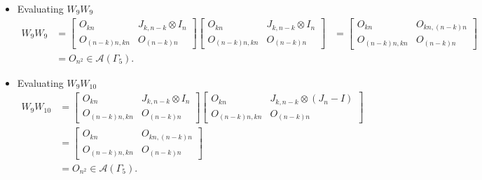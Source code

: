 \begin{itemize}
\item Evaluating $W_{9}W_{9}$
\begin{align*}
    W_9W_9
    &= \begin{bmatrix}
        O_{kn} & J_{k,n-k} \otimes I_n \\
        O_{(n-k)n,kn} & O_{(n-k)n}
    \end{bmatrix}
    \begin{bmatrix}
        O_{kn} & J_{k,n-k} \otimes I_n \\
        O_{(n-k)n,kn} & O_{(n-k)n}
    \end{bmatrix}
    &= \begin{bmatrix}
        O_{kn} & O_{kn, (n-k)n} \\
        O_{(n-k)n,kn} & O_{(n - k)n}
    \end{bmatrix}\\
    &= O_{n^2} \in\mathcal{A}(\Gamma_5).
\end{align*}

\item Evaluating $W_{9}W_{10}$
\begin{align*}
    W_9W_{10}
    &= \begin{bmatrix}
        O_{kn} & J_{k,n-k} \otimes I_n \\
        O_{(n-k)n,kn} & O_{(n-k)n}
    \end{bmatrix}
    \begin{bmatrix}
        O_{kn} & J_{k,n-k} \otimes (J_n-I) \\
        O_{(n-k)n,kn} & O_{(n-k)n}
    \end{bmatrix}\\
    &= \begin{bmatrix}
        O_{kn} & O_{kn, (n-k)n} \\
        O_{(n-k)n,kn} & O_{(n - k)n}
    \end{bmatrix}\\
    &= O_{n^2} \in\mathcal{A}(\Gamma_5).
\end{align*}


\end{itemize}
